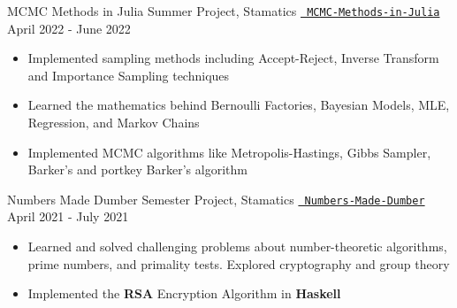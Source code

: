   \cventry
  {MCMC Methods in Julia}
  {Summer Project, Stamatics}
  {\texttt{\href{https://github.com/abhishekshree/mcmc-methods-in-julia}{\faGithub{} MCMC-Methods-in-Julia}}}
  {April 2022 - June 2022}
  {
    \begin{itemize}
      \item Implemented sampling methods including Accept-Reject, Inverse Transform and Importance Sampling techniques
      \item Learned the mathematics behind Bernoulli Factories, Bayesian Models, MLE, Regression, and Markov Chains
      \item Implemented MCMC algorithms like Metropolis-Hastings, Gibbs Sampler, Barker's and portkey Barker’s algorithm
    \end{itemize}
  }
  \cventry
  {Numbers Made Dumber}
  {Semester Project, Stamatics}
  {\texttt{\href{https://github.com/abhishekshree/Numbers-Made-Dumber}{\faGithub{} Numbers-Made-Dumber}}}
  {April 2021 - July 2021}
  {
    \begin{itemize}
      \item Learned and solved challenging problems about number-theoretic algorithms, prime numbers, and primality tests. Explored cryptography and group theory
      \item Implemented the \textbf{RSA} Encryption Algorithm in \textbf{Haskell}
    \end{itemize}
  }
\vspace{-2mm}

